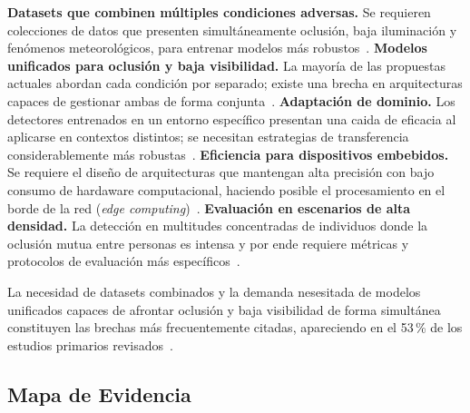 \documentclass[12pt, a4paper]{article}
\begin{document}
\textbf{Datasets que combinen m\'{u}ltiples condiciones adversas.} Se
requieren colecciones de datos que presenten simult\'{a}neamente
oclusi\'{o}n, baja iluminaci\'{o}n y fen\'{o}menos meteorol\'{o}gicos,
para entrenar modelos m\'{a}s robustos~\cite{E31, E07}.
\textbf{Modelos unificados para oclusi\'{o}n y baja visibilidad.} La
mayor\'{i}a de las propuestas actuales abordan cada condici\'{o}n por
separado; existe una brecha en arquitecturas capaces de gestionar ambas
de forma conjunta~\cite{E20, E26}.
\textbf{Adaptaci\'{o}n de dominio.} Los detectores entrenados en un
entorno espec\'{i}fico presentan una caida de eficacia al aplicarse en
contextos distintos; se necesitan estrategias de transferencia considerablemente m\'{a}s
robustas~\cite{E09, E30}.
\textbf{Eficiencia para dispositivos embebidos.} Se requiere el
dise\~{n}o de arquitecturas que mantengan alta precisi\'{o}n con bajo
consumo de hardaware computacional, haciendo posible el procesamiento en el borde de la
red (\textit{edge computing})~\cite{E32, E23}.
\textbf{Evaluaci\'{o}n en escenarios de alta densidad.} La
detecci\'{o}n en multitudes concentradas de individuos donde la oclusi\'{o}n mutua entre
personas es intensa y por ende requiere m\'{e}tricas y protocolos de
evaluaci\'{o}n m\'{a}s espec\'{i}ficos~\cite{E28, E09}.

\begin{hallazgo}[]
  La necesidad de datasets combinados y la demanda nesesitada de modelos unificados
  capaces de afrontar oclusi\'{o}n y baja visibilidad de forma
  simult\'{a}nea constituyen las brechas m\'{a}s frecuentemente
  citadas, apareciendo en el 53\,\% de los estudios primarios
  revisados~\cite{E31, E07, E17, E20, E26}.
\end{hallazgo}

\subsection{Mapa de Evidencia}
\end{document}
